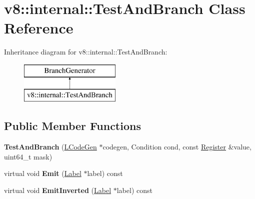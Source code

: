 \hypertarget{classv8_1_1internal_1_1_test_and_branch}{}\section{v8\+:\+:internal\+:\+:Test\+And\+Branch Class Reference}
\label{classv8_1_1internal_1_1_test_and_branch}
Inheritance diagram for v8\+:\+:internal\+:\+:Test\+And\+Branch\+:\begin{figure}[H]
\begin{center}
\leavevmode
\includegraphics[height=2.000000cm]{classv8_1_1internal_1_1_test_and_branch}
\end{center}
\end{figure}
\subsection*{Public Member Functions}
\begin{DoxyCompactItemize}
\item 
{\bfseries Test\+And\+Branch} (\hyperlink{classv8_1_1internal_1_1_l_code_gen}{L\+Code\+Gen} $\ast$codegen, Condition cond, const \hyperlink{structv8_1_1internal_1_1_register}{Register} \&value, uint64\+\_\+t mask)\hypertarget{classv8_1_1internal_1_1_test_and_branch_a66c0392de429181152ef9d5e53fdd8ef}{}\label{classv8_1_1internal_1_1_test_and_branch_a66c0392de429181152ef9d5e53fdd8ef}

\item 
virtual void {\bfseries Emit} (\hyperlink{classv8_1_1internal_1_1_label}{Label} $\ast$label) const \hypertarget{classv8_1_1internal_1_1_test_and_branch_acc76d1f8a1236e9f2bc1d7aee8f15eee}{}\label{classv8_1_1internal_1_1_test_and_branch_acc76d1f8a1236e9f2bc1d7aee8f15eee}

\item 
virtual void {\bfseries Emit\+Inverted} (\hyperlink{classv8_1_1internal_1_1_label}{Label} $\ast$label) const \hypertarget{classv8_1_1internal_1_1_test_and_branch_a1a47f0975e5e499eb50f1e533e944c10}{}\label{classv8_1_1internal_1_1_test_and_branch_a1a47f0975e5e499eb50f1e533e944c10}

\end{DoxyCompactItemize}
